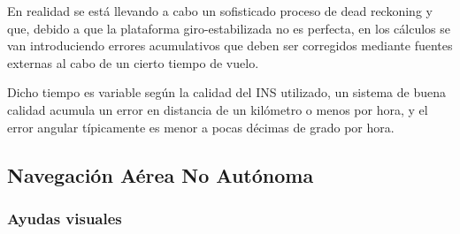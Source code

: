 \begin{description}











En realidad se est\'a llevando a cabo un sofisticado proceso de dead reckoning  y que, debido a que la plataforma giro-estabilizada no es perfecta, en los c\'alculos se van introduciendo errores acumulativos que deben ser corregidos mediante fuentes externas al cabo de un cierto tiempo de vuelo.

Dicho tiempo es variable seg\'un la calidad del INS utilizado, un sistema de buena calidad acumula un error en distancia de un kil\'ometro o menos por hora, y el error angular t\'ipicamente es menor a pocas d\'ecimas de grado por hora. 

\end{description}

\subsection{Navegaci\'on A\'erea No Aut\'onoma}

\subsubsection{Ayudas visuales}

